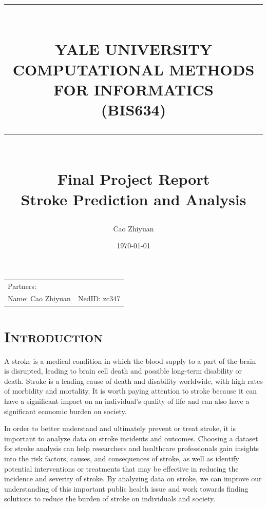 \documentclass[a4paper,12pt]{article}
\title{ \rule{\textwidth}{0.3mm} \\YALE UNIVERSITY \\ COMPUTATIONAL METHODS FOR INFORMATICS \\ (BIS634) \\ \rule{\textwidth}{0.3mm} \\ [30 mm]  \Large{Final Project Report} \\[5 mm]  Stroke Prediction and Analysis \\[15 mm]} %
\author{Cao Zhiyuan} %
\date{\today} %
\begin{document}
\scshape

\maketitle %

\begin{center}
\begin{tabular}{l l}
\\[16 mm]
Partners:  \\
Name: Cao Zhiyuan & NedID: zc347 \\
\end{tabular}
\end{center}
\thispagestyle{empty}


\newpage


\small\tableofcontents
\thispagestyle{empty}


\newpage


\setcounter{page}{1}
\section{\textsc{Introduction}}
\upshape
A stroke is a medical condition in which the blood supply to a part of the brain is disrupted, leading to brain cell death and possible long-term disability or death. Stroke is a leading cause of death and disability worldwide, with high rates of morbidity and mortality. It is worth paying attention to stroke because it can have a significant impact on an individual's quality of life and can also have a significant economic burden on society.

In order to better understand and ultimately prevent or treat stroke, it is important to analyze data on stroke incidents and outcomes. Choosing a dataset for stroke analysis can help researchers and healthcare professionals gain insights into the risk factors, causes, and consequences of stroke, as well as identify potential interventions or treatments that may be effective in reducing the incidence and severity of stroke. By analyzing data on stroke, we can improve our understanding of this important public health issue and work towards finding solutions to reduce the burden of stroke on individuals and society.
\end{document}
